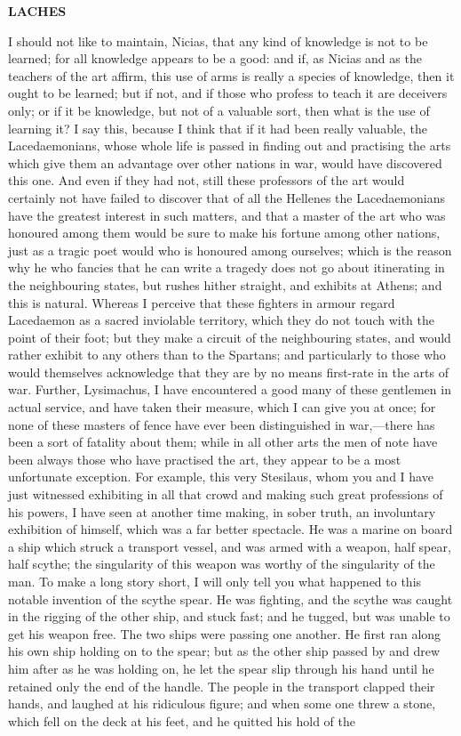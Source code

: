 \documentclass[11pt,letter]{article}
\begin{document}
\par \textbf{LACHES}
\par   I should not like to maintain, Nicias, that any kind of knowledge is not to be learned; for all knowledge appears to be a good:  and if, as Nicias and as the teachers of the art affirm, this use of arms is really a species of knowledge, then it ought to be learned; but if not, and if those who profess to teach it are deceivers only; or if it be knowledge, but not of a valuable sort, then what is the use of learning it? I say this, because I think that if it had been really valuable, the Lacedaemonians, whose whole life is passed in finding out and practising the arts which give them an advantage over other nations in war, would have discovered this one. And even if they had not, still these professors of the art would certainly not have failed to discover that of all the Hellenes the Lacedaemonians have the greatest interest in such matters, and that a master of the art who was honoured among them would be sure to make his fortune among other nations, just as a tragic poet would who is honoured among ourselves; which is the reason why he who fancies that he can write a tragedy does not go about itinerating in the neighbouring states, but rushes hither straight, and exhibits at Athens; and this is natural. Whereas I perceive that these fighters in armour regard Lacedaemon as a sacred inviolable territory, which they do not touch with the point of their foot; but they make a circuit of the neighbouring states, and would rather exhibit to any others than to the Spartans; and particularly to those who would themselves acknowledge that they are by no means first-rate in the arts of war. Further, Lysimachus, I have encountered a good many of these gentlemen in actual service, and have taken their measure, which I can give you at once; for none of these masters of fence have ever been distinguished in war,—there has been a sort of fatality about them; while in all other arts the men of note have been always those who have practised the art, they appear to be a most unfortunate exception. For example, this very Stesilaus, whom you and I have just witnessed exhibiting in all that crowd and making such great professions of his powers, I have seen at another time making, in sober truth, an involuntary exhibition of himself, which was a far better spectacle. He was a marine on board a ship which struck a transport vessel, and was armed with a weapon, half spear, half scythe; the singularity of this weapon was worthy of the singularity of the man. To make a long story short, I will only tell you what happened to this notable invention of the scythe spear. He was fighting, and the scythe was caught in the rigging of the other ship, and stuck fast; and he tugged, but was unable to get his weapon free. The two ships were passing one another. He first ran along his own ship holding on to the spear; but as the other ship passed by and drew him after as he was holding on, he let the spear slip through his hand until he retained only the end of the handle. The people in the transport clapped their hands, and laughed at his ridiculous figure; and when some one threw a stone, which fell on the deck at his feet, and he quitted his hold of the 
\end{document}
